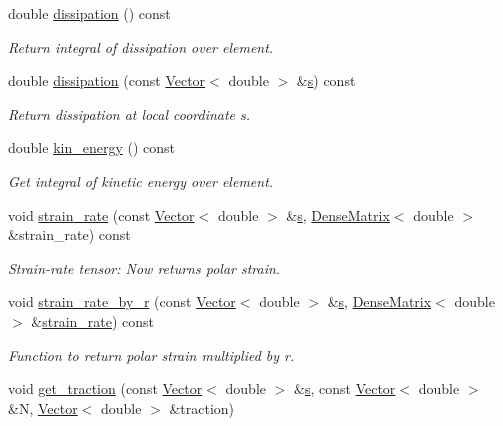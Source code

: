 \begin{DoxyCompactItemize}
double \hyperlink{classoomph_1_1PolarNavierStokesEquations_a058dc7463bf84d85eebf98a32037adb4}{dissipation} () const
\begin{DoxyCompactList}\small\item\em Return integral of dissipation over element. \end{DoxyCompactList}\item 
double \hyperlink{classoomph_1_1PolarNavierStokesEquations_ae8db187877c291548f6249266a4f6341}{dissipation} (const \hyperlink{classoomph_1_1Vector}{Vector}$<$ double $>$ \&\hyperlink{cfortran_8h_ab7123126e4885ef647dd9c6e3807a21c}{s}) const
\begin{DoxyCompactList}\small\item\em Return dissipation at local coordinate s. \end{DoxyCompactList}\item 
double \hyperlink{classoomph_1_1PolarNavierStokesEquations_a1e9cfddfe57aa786569129ea22c637b0}{kin\+\_\+energy} () const
\begin{DoxyCompactList}\small\item\em Get integral of kinetic energy over element. \end{DoxyCompactList}\item 
void \hyperlink{classoomph_1_1PolarNavierStokesEquations_a5d46a1417439c7abd56219f8a538a63a}{strain\+\_\+rate} (const \hyperlink{classoomph_1_1Vector}{Vector}$<$ double $>$ \&\hyperlink{cfortran_8h_ab7123126e4885ef647dd9c6e3807a21c}{s}, \hyperlink{classoomph_1_1DenseMatrix}{Dense\+Matrix}$<$ double $>$ \&strain\+\_\+rate) const
\begin{DoxyCompactList}\small\item\em Strain-\/rate tensor\+: Now returns polar strain. \end{DoxyCompactList}\item 
void \hyperlink{classoomph_1_1PolarNavierStokesEquations_a969a6d8caaa879136a4fb6ed00cc6cf2}{strain\+\_\+rate\+\_\+by\+\_\+r} (const \hyperlink{classoomph_1_1Vector}{Vector}$<$ double $>$ \&\hyperlink{cfortran_8h_ab7123126e4885ef647dd9c6e3807a21c}{s}, \hyperlink{classoomph_1_1DenseMatrix}{Dense\+Matrix}$<$ double $>$ \&\hyperlink{classoomph_1_1PolarNavierStokesEquations_a5d46a1417439c7abd56219f8a538a63a}{strain\+\_\+rate}) const
\begin{DoxyCompactList}\small\item\em Function to return polar strain multiplied by r. \end{DoxyCompactList}\item 
void \hyperlink{classoomph_1_1PolarNavierStokesEquations_a535d5104145a0ebb128c850c5d87d3c4}{get\+\_\+traction} (const \hyperlink{classoomph_1_1Vector}{Vector}$<$ double $>$ \&\hyperlink{cfortran_8h_ab7123126e4885ef647dd9c6e3807a21c}{s}, const \hyperlink{classoomph_1_1Vector}{Vector}$<$ double $>$ \&N, \hyperlink{classoomph_1_1Vector}{Vector}$<$ double $>$ \&traction)

\end{DoxyCompactItemize}
